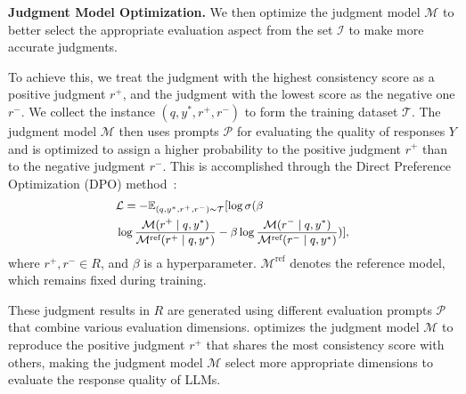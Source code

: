\textbf{Judgment Model Optimization.} We then optimize the judgment model $\mathcal{M}$ to better select the appropriate evaluation aspect from the set $\mathcal{I}$ to make more accurate judgments.

To achieve this, we treat the judgment with the highest consistency score as a positive judgment $r^+$, and the judgment with the lowest score as the negative one $r^-$. We collect the instance $(q, y^*, r^+, r^-)$ to form the training dataset $\mathcal{T}$. The judgment model $\mathcal{M}$ then uses prompts $\mathcal{P}$ for evaluating the quality of responses $Y$ and is optimized to assign a higher probability to the positive judgment $r^+$ than to the negative judgment $r^-$. This is accomplished through the Direct Preference Optimization (DPO) method~\cite{DPO2023Rafailov}:
\begin{equation}\small\label{eq:dpo}
\begin{aligned}
 & \mathcal{L}= - \mathbb{E}_{(q, y^*, r^+, r^-) \sim \mathcal{T}} [\log \sigma(\beta \\ &\log \frac{\mathcal{M}(r^+ \mid q, y^*)}{\mathcal{M}^\text{ref}(r^+ \mid q, y^*)} - \beta \log \frac{\mathcal{M}(r^- \mid q, y^*)}{\mathcal{M}^\text{ref} (r^- \mid q, y^*)})],
\end{aligned}
\end{equation}
where $r^+, r^- \in R$, and $\beta$ is a hyperparameter. $\mathcal{M}^\text{ref}$ denotes the reference model, which remains fixed during training. 

These judgment results in $R$ are generated using different evaluation prompts $\mathcal{P}$ that combine various evaluation dimensions. \method{} optimizes the judgment model $\mathcal{M}$ to reproduce the positive judgment $r^+$ that shares the most consistency score with others, making the judgment model $\mathcal{M}$ select more appropriate dimensions to evaluate the response quality of LLMs.














